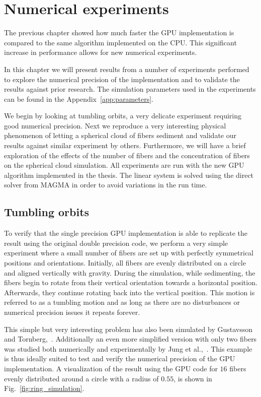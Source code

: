 \chapter{Numerical experiments}
\label{cha:experiments}

The previous chapter showed how much faster the GPU implementation is compared to the same algorithm implemented on the CPU. This significant increase in performance allows for new numerical experiments.

In this chapter we will present results from a number of experiments performed to explore the numerical precision of the implementation and to validate the results against prior research. The simulation parameters used in the experiments can be found in the Appendix~\ref{app:parameters}.

We begin by looking at tumbling orbits, a very delicate experiment requiring good numerical precision. Next we reproduce a very interesting physical phenomenon of letting a spherical cloud of fibers sediment and validate our results against similar experiment by others. Furthermore, we will have a brief exploration of the effects of the number of fibers and the concentration of fibers on the spherical cloud simulation. All experiments are run with the new GPU algorithm  implemented in the thesis. The linear system is solved using the direct solver from MAGMA in order to avoid variations in the run time.

\section{Tumbling orbits}
\label{sec:example_ring}

To verify that the single precision GPU implementation is able to replicate the result using the original double precision code, we perform a very simple experiment where a small number of fibers are set up with perfectly symmetrical positions and orientations. Initially, all fibers are evenly distributed on a circle and aligned vertically with gravity. During the simulation, while sedimenting, the fibers begin to rotate from their vertical orientation towards a horizontal position. Afterwards, they continue rotating back into the vertical position. This motion is referred to as a tumbling motion and as long as there are no disturbances or numerical precision issues it repeats forever.

This simple but very interesting problem has also been simulated by Gustavsson and Tornberg,~\cite{Gustavsson2009}. Additionally an even more simplified version with only two fibers was studied both numerically and experimentally by Jung et al.,~\cite{Jung2006}. This example is thus ideally suited to test and verify the numerical precision of the GPU implementation. A visualization of the result using the GPU code for $16$ fibers evenly distributed around a circle with a radius of $0.55$, is shown in Fig.~\ref{fig:ring_simulation}.

